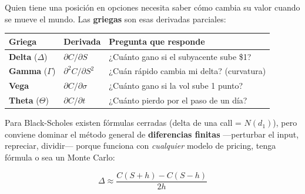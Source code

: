 \documentclass[
  spanish,
  letterpaper,
  DIV=11,
  numbers=noendperiod]{scrreprt}
\begin{document}
Quien tiene una posición en opciones necesita saber cómo cambia su valor
cuando se mueve el mundo. Las \textbf{griegas} son esas derivadas
parciales:

\begin{longtable}[]{@{}
  >{\centering\arraybackslash}p{}
  >{\centering\arraybackslash}p{}
  >{\raggedright\arraybackslash}p{}@{}}
\toprule\noalign{}
\begin{minipage}[b]{\linewidth}\centering
Griega
\end{minipage} & \begin{minipage}[b]{\linewidth}\centering
Derivada
\end{minipage} & \begin{minipage}[b]{\linewidth}\raggedright
Pregunta que responde
\end{minipage} \\
\midrule\noalign{}
\endhead
\bottomrule\noalign{}
\endlastfoot
\textbf{Delta} (\(\Delta\)) & \(\partial C/\partial S\) & ¿Cuánto gano
si el subyacente sube \$1? \\
\textbf{Gamma} (\(\Gamma\)) & \(\partial^2 C/\partial S^2\) & ¿Cuán
rápido cambia mi delta? (curvatura) \\
\textbf{Vega} & \(\partial C/\partial \sigma\) & ¿Cuánto gano si la vol
sube 1 punto? \\
\textbf{Theta} (\(\Theta\)) & \(\partial C/\partial t\) & ¿Cuánto pierdo
por el paso de un día? \\
\end{longtable}

Para Black-Scholes existen fórmulas cerradas (delta de una call =
\(N(d_1)\)), pero conviene dominar el método general de
\textbf{diferencias finitas} ---perturbar el input, repreciar,
dividir--- porque funciona con \emph{cualquier} modelo de pricing, tenga
fórmula o sea un Monte Carlo:

\[\Delta \approx \frac{C(S + h) - C(S - h)}{2h}\]
\end{document}
